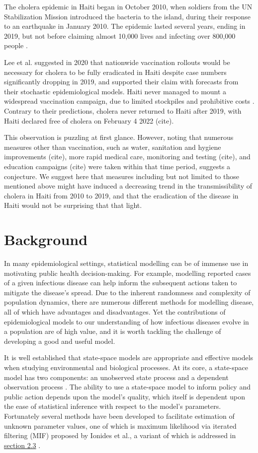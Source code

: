 \documentclass[12pt]{article}
\begin{document}
  The cholera epidemic in Haiti began in October 2010, when soldiers from the UN Stabilization Mission introduced the bacteria to the island, during their response to an earthquake in January 2010. The epidemic lasted several years, ending in 2019, but not before claiming almost 10,000 lives and infecting over 800,000 people \cite{Lee_haiticholera}. 
  
  Lee et al. \cite{Lee_haiticholera} suggested in 2020 that nationwide vaccination rollouts would be necessary for cholera to be fully eradicated in Haiti despite case numbers significantly dropping in 2019, and supported their claim with forecasts from their stochastic epidemiological models. Haiti never managed to mount a widespread vaccination campaign, due to limited stockpiles and prohibitive costs \cite{rebaudet}. Contrary to their predictions, cholera never returned to Haiti after 2019, with Haiti declared free of cholera on February 4 2022 (cite). 
  
  This observation is puzzling at first glance. However, noting that numerous measures other than vaccination, such as water, sanitation and hygiene improvements (cite), more rapid medical care, monitoring and testing (cite), and education campaigns (cite) were taken within that time period, suggests a conjecture. We suggest here that measures including but not limited to those mentioned above might have induced a decreasing trend in the transmissibility of cholera in Haiti from 2010 to 2019, and that the eradication of the disease in Haiti would not be surprising that that light.


\section{Background}

 In many epidemiological settings, statistical modelling can be of immense use in motivating public health decision-making. For example, modelling reported cases of a given infectious disease can help inform the subsequent actions taken to mitigate the disease's spread. Due to the inherent randomness and complexity of population dynamics, there are numerous different methods for modelling disease, all of which have advantages and disadvantages. Yet the contributions of epidemiological models to our understanding of how infectious diseases evolve in a population are of high value, and it is worth tackling the challenge of developing a good and useful model.
  
  It is well established that state\hyp{}space models are appropriate and effective models when studying environmental and biological processes. At its core, a state\hyp{}space model has two components: an unobserved state process and a dependent observation process \cite{Ionides_infdynsys}. The ability to use a state\hyp{}space model to inform policy and public action depends upon the model's quality, which itself is dependent upon the ease of statistical inference with respect to the model's parameters. Fortunately several methods have been developed to facilitate estimation of unknown parameter values, one of which is maximum likelihood via iterated filtering (MIF) proposed by Ionides et al., a variant of which is addressed in \hyperref[sec:like]{section 2.3} \cite{Ionides_if}.
  
\end{document}

